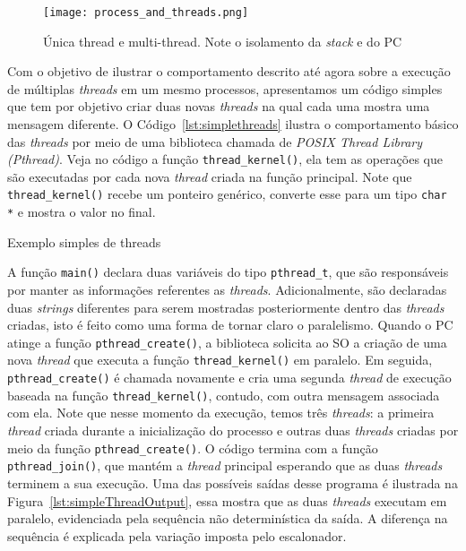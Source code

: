 \begin{figure}[!h]
  \centering
  \texttt{[image: process\_and\_threads.png]}
  \caption{Única thread e multi-thread. Note o isolamento da \emph{stack} e do PC~\citep{silberschatz}}
  \label{fig:single_thread_multi_thread}
\end{figure}

Com o objetivo de ilustrar o comportamento descrito até agora sobre a execução
de múltiplas \emph{threads} em um mesmo processos, apresentamos um código
simples que tem por objetivo criar duas novas \emph{threads} na qual cada uma
mostra uma mensagem diferente. O Código~\ref{lst:simplethreads} ilustra o
comportamento básico das \emph{threads} por meio de uma biblioteca chamada de
\emph{POSIX Thread Library (Pthread)}. Veja no código a função
\texttt{thread\_kernel()}, ela tem as operações que são executadas por cada nova
\emph{thread} criada na função principal. Note que \texttt{thread\_kernel()}
recebe um ponteiro genérico, converte esse para um tipo \texttt{char *} e
mostra o valor no final.

\begin{ruledcaption}{Exemplo simples de threads\label{lst:simplethreads}}

\end{ruledcaption}

A função \texttt{main()} declara duas variáveis do tipo \texttt{pthread\_t},
que são responsáveis por manter as informações referentes as \emph{threads}.
Adicionalmente, são declaradas duas \emph{strings} diferentes para serem
mostradas posteriormente dentro das \emph{threads} criadas, isto é feito como
uma forma de tornar claro o paralelismo. Quando o PC atinge a função
\texttt{pthread\_create()}, a biblioteca solicita ao SO a criação de uma nova
\emph{thread} que executa a função \texttt{thread\_kernel()} em paralelo. Em
seguida, \texttt{pthread\_create()} é chamada novamente e cria uma segunda
\emph{thread} de execução baseada na função \texttt{thread\_kernel()}, contudo,
com outra mensagem associada com ela. Note que nesse momento da execução, temos
três \emph{threads}: a primeira \emph{thread} criada durante a inicialização do
processo e outras duas \emph{threads} criadas por meio da função
\texttt{pthread\_create()}. O código termina com a função
\texttt{pthread\_join()}, que mantém a \emph{thread} principal esperando que as
duas \emph{threads} terminem a sua execução. Uma das possíveis saídas desse
programa é ilustrada na Figura~\ref{lst:simpleThreadOutput}, essa mostra que as
duas \emph{threads} executam em paralelo, evidenciada pela sequência não
determinística da saída. A diferença na sequência é explicada pela variação
imposta pelo escalonador.

